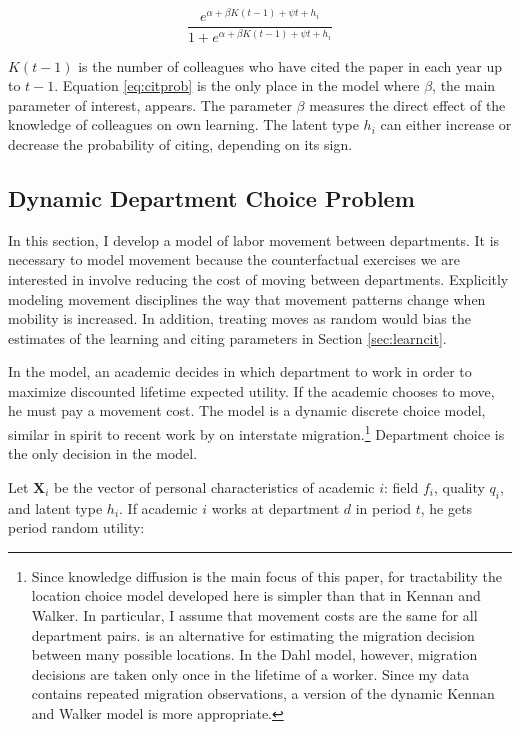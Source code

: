 \documentclass[]{article}
\begin{document}
\begin{equation}
    \frac{e^{\alpha + \beta K(t-1) + \psi t + h_i}}{1 + e^{\alpha + \beta K(t-1) + \psi t + h_i}}
    \label{eq:citprob}
\end{equation}

$K(t-1)$ is the number of colleagues who have cited the
paper in each year up to $t-1$. Equation \eqref{eq:citprob} is the only place in the
model where $\beta$, the main parameter of interest, appears. The
parameter $\beta$ measures the direct effect of the knowledge of colleagues on own
learning. The latent type $h_i$ can either increase or decrease the
probability of citing, depending on its sign.

\subsection{Dynamic Department Choice Problem}

In this section, I develop a model of labor movement between departments.  It is necessary to model movement because the counterfactual exercises we are interested in involve reducing the cost of moving between departments.  Explicitly modeling movement disciplines the way that movement patterns change when mobility is increased.  In addition, treating moves as random would bias the estimates of the learning and citing parameters in Section \ref{sec:learncit}.

In the model, an academic decides in which department to work in order to
maximize discounted lifetime expected utility. If the academic chooses to move, he must pay a movement cost.  The model is a dynamic discrete choice model, similar in spirit to recent work by \citet{kennan2011effect} on interstate migration.\footnote{Since knowledge diffusion is the main focus of this paper, for tractability the location choice model developed here is simpler than that in Kennan and Walker.  In particular, I assume that movement costs are the same for all department pairs.  \citet{dahl2002mobility} is an alternative for estimating the migration decision between many possible locations.  In the Dahl model, however, migration decisions are taken only once in the lifetime of a worker.  Since my data contains repeated migration observations,  a version of the dynamic Kennan and Walker model is more appropriate.} Department choice is the only decision in the model.

Let $\mathbf{X}_i$ be the vector of personal characteristics of academic $i$: field $f_i$, quality
$q_i$, and latent type $h_i$. If academic $i$ works at department
$d$ in period $t$, he gets period random utility:
\end{document}
